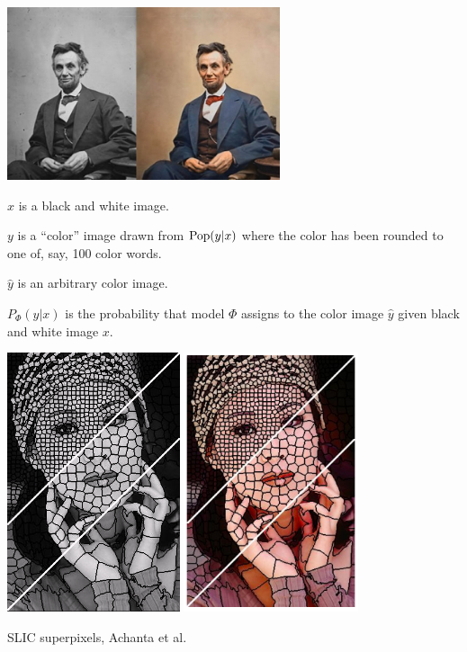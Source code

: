  



\centerline{\includegraphics[height = 2in]{../images/colorization}}

$x$ is a black and white image.

\vfill
$y$ is a ``color'' image drawn from $\mathrm{Pop}(y|x)$ where the color has been rounded to one of, say, 100 color words.

\vfill
$\hat{y}$ is an arbitrary color image.

\vfill
$P_\Phi(\hat{y}|x)$ is the probability that model $\Phi$ assigns to the color image $\hat{y}$ given black and white image $x$.

\centerline{\includegraphics[height = 3in]{../images/SLIC} \hspace{.5in} \includegraphics[height = 3in]{../images/SLICcolor}}
\centerline{\huge SLIC superpixels, Achanta et al.}

